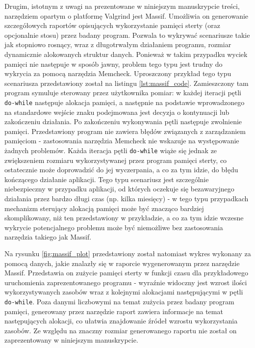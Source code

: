 Drugim, istotnym z uwagi na prezentowane w niniejszym manuskrypcie treści, narzędziem opartym o platformę Valgrind jest Massif. Umożliwia on generowanie szczegółowych raportów opisujących wykorzystanie pamięci sterty (oraz opcjonalnie stosu) przez badany program. Pozwala to wykrywać scenariusze takie jak stopniowo rosnący, wraz z długotrwałym działaniem programu, rozmiar dynamicznie alokowanych struktur danych. Ponieważ w takim przypadku wyciek pamięci nie następuje w sposób jawny, problem tego typu jest trudny do wykrycia za pomocą narzędzia Memcheck. Uproszczony przykład tego typu scenariusza przedstawiony został na listingu \ref{lst:massif_code}. Zamieszczony tam program symuluje sterowany przez użytkownika pomiar: w każdej iteracji pętli \lstinline{do-while} następuje alokacja pamięci, a następnie na podstawie wprowadzonego na standardowe wejście znaku podejmowana jest decyzja o kontynuacji lub zakończeniu działania. Po zakończeniu wykonywania pętli następuje zwolnienie pamięci. Przedstawiony program nie zawiera błędów związanych z zarządzaniem pamięciom - zastosowania narzędzia Memcheck nie wskazuje na występowanie żadnych problemów. Każda iteracja pętli \lstinline{do-while} wiąże się jednak ze zwiększeniem rozmiaru wykorzystywanej przez program pamięci sterty, co ostatecznie może doprowadzić do jej wyczerpania, a co za tym idzie, do błędu kończącego działanie aplikacji. Tego typu scenariusz jest szczególnie niebezpieczny w przypadku aplikacji, od których oczekuje się bezawaryjnego działania przez bardzo długi czas (np. kilka miesięcy) - w tego typu przypadkach mechanizm sterujący alokacją pamięci może być znacząco bardziej skomplikowany, niż ten przedstawiony w przykładzie, a co za tym idzie wczesne wykrycie potencjalnego problemu może być niemożliwe bez zastosowania narzędzia takiego jak Massif.



Na rysunku \ref{fig:massif_plot} przedstawiony został natomiast wykres wykonany za pomocą danych, jakie znalazły się w raporcie wygenerowanym przez narzędzie Massif. Przedstawia on zużycie pamięci sterty w funkcji czasu dla przykładowego uruchomienia zaprezentowanego programu - wyraźnie widoczny jest wzrost ilości wykorzystywanych zasobów wraz z kolejnymi alokacjami następującymi w pętli \lstinline{do-while}. Poza danymi liczbowymi na temat zużycia przez badany program pamięci, generowany przez narzędzie raport zawiera informacje na temat następujących alokacji, co ułatwia znajdowanie źródeł wzrostu wykorzystania zasobów. Ze względu na znaczny rozmiar generowanego raportu nie został on zaprezentowany w niniejszym manuskrypcie.

